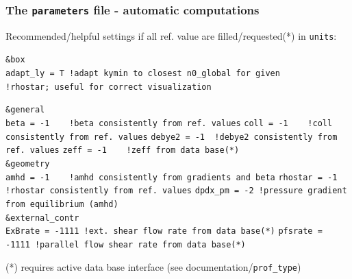 \documentclass[10pt]{beamer}
\begin{document}
\begin{frame}[fragile]
  \frametitle{The {\tt parameters} file - automatic computations}

\begin{block}{Recommended/helpful settings if all ref. value are filled/requested(*) in {\tt units}:}

\begin{block}

\verb|&box|\\
\verb|adapt_ly = T !adapt kymin to closest n0_global for given|
\verb|             !rhostar; useful for correct visualization|

\verb|&general|\\
\verb|beta = -1    !beta consistently from ref. values|
\verb|coll = -1    !coll consistently from ref. values|
\verb|debye2 = -1  !debye2 consistently from ref. values|
\verb|zeff = -1    !zeff from data base(*)|\\[1ex]

\verb|&geometry|\\
\verb|amhd = -1    !amhd consistently from gradients and beta|
\verb|rhostar = -1 !rhostar consistently from ref. values|
\verb|dpdx_pm = -2 !pressure gradient from equilibrium (amhd)|\\[1ex]

\verb|&external_contr|\\
\verb|ExBrate = -1111 !ext. shear flow rate from data base(*)|
\verb|pfsrate = -1111 !parallel flow shear rate from data base(*)|

\end{block}
(*) requires active data base interface (see documentation/{\tt prof\_type})
\end{block}


\end{frame}

\end{document}
